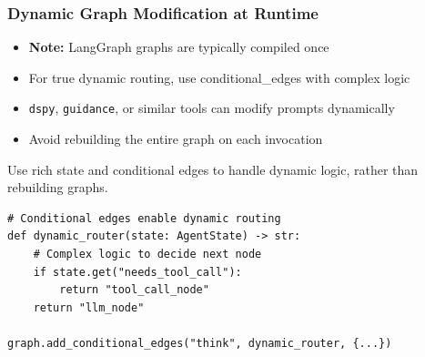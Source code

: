 \documentclass[aspectratio=169,11pt]{beamer}
\begin{document}
\begin{frame}[fragile]
\frametitle{Dynamic Graph Modification at Runtime}
\begin{itemize}
    \setlength{\itemsep}{1pt}
  \item \textbf{Note:} LangGraph graphs are typically compiled once
  \item For true dynamic routing, use conditional\_edges with complex logic
  \item \texttt{dspy}, \texttt{guidance}, or similar tools can modify prompts dynamically
  \item Avoid rebuilding the entire graph on each invocation
\end{itemize}

\vspace{10pt}
\begin{tipbox}
Use rich state and conditional edges to handle dynamic logic, rather than rebuilding graphs.
\end{tipbox}

\vspace{10pt}
\begin{lstlisting}
# Conditional edges enable dynamic routing
def dynamic_router(state: AgentState) -> str:
    # Complex logic to decide next node
    if state.get("needs_tool_call"):
        return "tool_call_node"
    return "llm_node"

graph.add_conditional_edges("think", dynamic_router, {...})
\end{lstlisting}
\end{frame}
\end{document}
